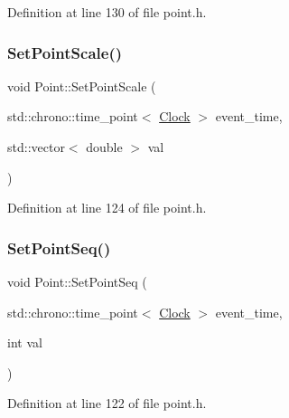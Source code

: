 Definition at line 130 of file point.\+h.

\mbox{\label{class_point_a8fc02455a773624df80933403b0e545f}} 
\subsubsection{\texorpdfstring{Set\+Point\+Scale()}{SetPointScale()}}
{\footnotesize\ttfamily void Point\+::\+Set\+Point\+Scale (\begin{DoxyParamCaption}\item[{std\+::chrono\+::time\+\_\+point$<$ \hyperlink{universe_8h_a0ef8d951d1ca5ab3cfaf7ab4c7a6fd80}{Clock} $>$}]{event\+\_\+time,  }\item[{std\+::vector$<$ double $>$}]{val }\end{DoxyParamCaption})\hspace{0.3cm}{\ttfamily [inline]}}



Definition at line 124 of file point.\+h.

\mbox{\label{class_point_a912aefb007184f73b86c37257a415237}} 
\subsubsection{\texorpdfstring{Set\+Point\+Seq()}{SetPointSeq()}}
{\footnotesize\ttfamily void Point\+::\+Set\+Point\+Seq (\begin{DoxyParamCaption}\item[{std\+::chrono\+::time\+\_\+point$<$ \hyperlink{universe_8h_a0ef8d951d1ca5ab3cfaf7ab4c7a6fd80}{Clock} $>$}]{event\+\_\+time,  }\item[{int}]{val }\end{DoxyParamCaption})\hspace{0.3cm}{\ttfamily [inline]}}



Definition at line 122 of file point.\+h.

\mbox{\label{class_point_a60ccff89b647d069146a596b8c43d123}} 
